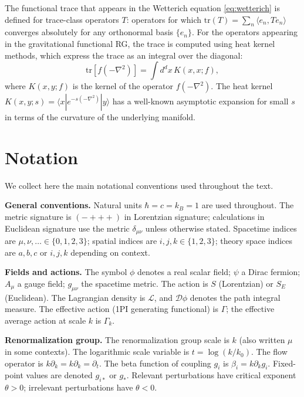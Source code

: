 \documentclass[11pt, twoside, openright]{book}
\theoremstyle{dotted}
\theoremstyle{definition}
\newcommand{\kdk}{k\partial_k}         %
\begin{document}
The functional trace that appears in the Wetterich equation \eqref{eq:wetterich}
is defined for trace-class operators $T$: operators for which $\mathrm{tr}(T) =
\sum_n \langle e_n, Te_n\rangle$ converges absolutely for any orthonormal basis
$\{e_n\}$. For the operators appearing in the gravitational functional RG, the
trace is computed using heat kernel methods, which express the trace as an integral
over the diagonal:
\begin{equation}
  \mathrm{tr}[f(-\nabla^2)] = \int d^dx \, K(x,x; f),
  \label{eq:heat_kernel_trace}
\end{equation}
where $K(x,y; f)$ is the kernel of the operator $f(-\nabla^2)$. The heat kernel
$K(x,y; s) = \langle x|e^{-s(-\nabla^2)}|y\rangle$ has a well-known asymptotic
expansion for small $s$ in terms of the curvature of the underlying manifold.

\chapter{Notation}
\label{app:notation}

We collect here the main notational conventions used throughout the text.

\medskip
\noindent\textbf{General conventions.}
Natural units $\hbar = c = k_B = 1$ are used throughout. The metric signature is
$({-}{+}{+}{+})$ in Lorentzian signature; calculations in Euclidean signature use
the metric $\delta_{\mu\nu}$ unless otherwise stated. Spacetime indices are
$\mu, \nu, \ldots \in \{0,1,2,3\}$; spatial indices are $i,j,k \in \{1,2,3\}$;
theory space indices are $a,b,c$ or $i,j,k$ depending on context.

\medskip
\noindent\textbf{Fields and actions.}
The symbol $\phi$ denotes a real scalar field; $\psi$ a Dirac fermion; $A_\mu$ a
gauge field; $g_{\mu\nu}$ the spacetime metric. The action is $S$ (Lorentzian) or
$S_E$ (Euclidean). The Lagrangian density is $\mathcal{L}$, and $\mathcal{D}\phi$
denotes the path integral measure. The effective action (1PI generating functional)
is $\Gamma$; the effective average action at scale $k$ is $\Gamma_k$.

\medskip
\noindent\textbf{Renormalization group.}
The renormalization group scale is $k$ (also written $\mu$ in some contexts).
The logarithmic scale variable is $t = \log(k/k_0)$. The flow operator is
$\kdk = k\partial_k = \partial_t$. The beta function of coupling $g_i$ is
$\beta_i = \kdk g_i$. Fixed-point values are denoted $g_{i*}$ or $g_*$. Relevant
perturbations have critical exponent $\theta > 0$; irrelevant perturbations have
$\theta < 0$.
\end{document}
